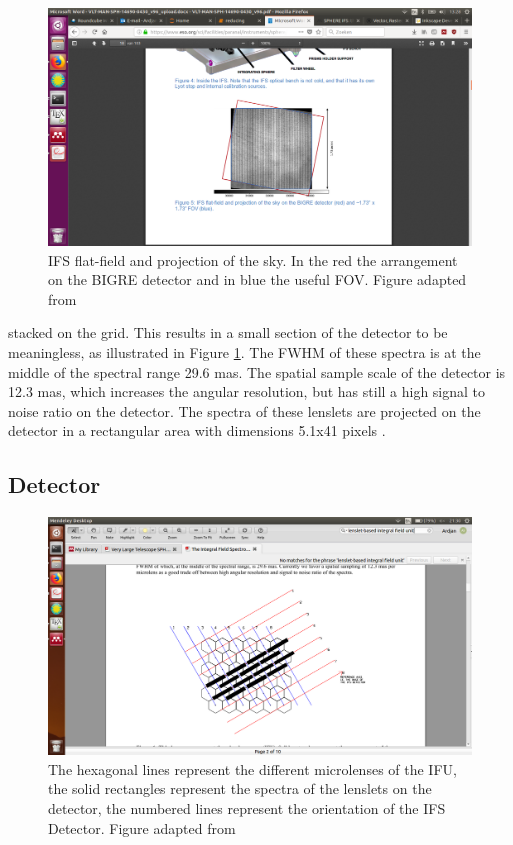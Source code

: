 \documentclass[twoside,single]{lion-msc}
\begin{document}
\begin{figure}
\centering 
\vspace{-9mm}
\includegraphics[trim={15cm 5.5cm 10cm 9.5cm},clip,scale = 0.47]{biggre}
\caption{IFS flat-field and projection of the sky. In the red the arrangement on the BIGRE detector and in blue the useful FOV. Figure adapted from \citep{Observatory2007}}
\label{fig:bigre}
\vspace{-7mm}
\end{figure}

\noindent
stacked on the grid. This results in a small section of the detector to be meaningless, as illustrated in Figure \ref{fig:bigre}. The FWHM of these spectra is at the middle of the spectral range 29.6 mas. The spatial sample scale of the detector is 12.3 mas, which increases the angular resolution, but has still a high signal to noise ratio on the detector. The spectra of these lenslets are projected on the detector in a rectangular area with dimensions 5.1x41 pixels \citep{Claudi2006}.

\subsection{Detector}
\begin{figure}[!b]
\centering 
\includegraphics[trim={15cm 1.5cm 10cm 8cm},clip,width = 0.7\linewidth]{bigregrid}
\caption{The hexagonal lines represent the different microlenses of the IFU, the solid rectangles represent the spectra of the lenslets on the detector, the numbered lines  represent the orientation of the IFS Detector. Figure adapted from \cite{Claudi2006}} 
\label{fig:bigregrid}
\end{figure}
\end{document}
